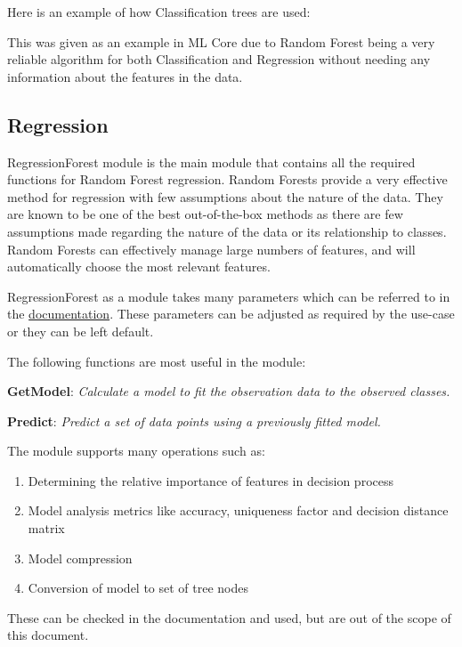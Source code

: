 Here is an example of how Classification trees are used:



This was given as an example in ML Core due to Random Forest being a very reliable algorithm for both Classification and Regression without needing any information about the features in the data.

\subsection{Regression}

RegressionForest module is the main module that contains all the required functions for Random Forest regression. Random Forests provide a very effective method for regression with few assumptions about the nature of the data. They are known to be one of the best out-of-the-box methods as there are few assumptions made regarding the nature of the data or its relationship to classes. Random Forests can effectively manage large numbers of features, and will automatically choose the most relevant features. 

RegressionForest as a module takes many parameters which can be referred to in the \href{https://cdn.hpccsystems.com/pdf/ml/LearningTrees.pdf}{documentation}. These parameters can be adjusted as required by the use-case or they can be left default. 

The following functions are most useful in the module:

\textbf{GetModel}: \textit{Calculate a model to fit the observation data to the observed classes.}

\textbf{Predict}: \textit{Predict a set of data points using a previously fitted model.}

The module supports many operations such as: 

\begin{enumerate}
    \item Determining the relative importance of features in decision process
    \item Model analysis metrics like accuracy, uniqueness factor and decision distance matrix
    \item Model compression
    \item Conversion of model to set of tree nodes
\end{enumerate}

These can be checked in the documentation and used, but are out of the scope of this document.

